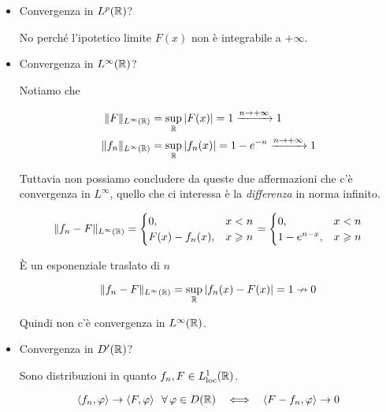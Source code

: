 \begin{itemize}
\item Convergenza in $L^{p}(\mathbb{R} )$?

No perché l'ipotetico limite $F( x)$ non è integrabile a $+\infty $.
\item Convergenza in $L^{\infty }(\mathbb{R} )$?

Notiamo che

\begin{equation*}
\begin{aligned}
\Vert F\Vert _{L^{\infty }(\mathbb{R} )} & =\sup _{\mathbb{R} }| F( x)| =1\xrightarrow{n\rightarrow +\infty } 1\\
\Vert f_{n}\Vert _{L^{\infty }(\mathbb{R} )} & =\sup _{\mathbb{R} }| f_{n}( x)| =1-e^{-n}\xrightarrow{n\rightarrow +\infty } 1
\end{aligned}
\end{equation*}

Tuttavia non possiamo concludere da queste due affermazioni che c'è convergenza in $L^{\infty }$, quello che ci interessa è la \textit{differenza} in norma infinito.

\begin{equation*}
\Vert f_{n} -F\Vert _{L^{\infty }(\mathbb{R} )} =\begin{cases}
0, & x< n\\
F( x) -f_{n}( x) , & x\geqslant n
\end{cases} =\begin{cases}
0, & x< n\\
1-e^{n-x} , & x\geqslant n
\end{cases}
\end{equation*}

È un esponenziale traslato di $n$

\begin{equation*}
\Vert f_{n} -F\Vert _{L^{\infty }(\mathbb{R} )} =\sup _{\mathbb{R} }| f_{n}( x) -F( x)| =1\nrightarrow 0
\end{equation*}

Quindi non c'è convergenza in $L^{\infty }(\mathbb{R} )$.
\item Convergenza in $D'(\mathbb{R} )$?

Sono distribuzioni in quanto $f_{n} ,F\in L^{1}_{\operatorname{loc}}(\mathbb{R} )$.

\begin{equation*}
\langle f_{n} ,\varphi \rangle \rightarrow \langle F,\varphi \rangle \ \ \forall \varphi \in D(\RR ) \ \ \iff \ \ \langle F-f_{n} ,\varphi \rangle \rightarrow 0
\end{equation*}


\end{itemize}
